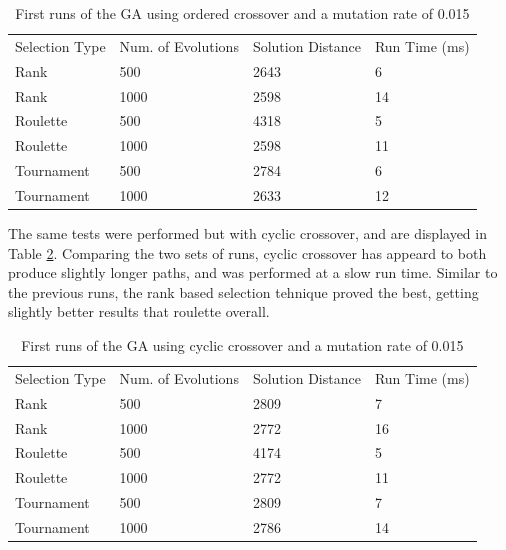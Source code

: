\documentclass[article]{IEEEtran}
\begin{document}
\begin{table}[H]
\centering
\caption{First runs of the GA using ordered crossover and a mutation rate of 0.015}
\label{tab:1}
\begin{tabular}{llll}
Selection Type & Num. of Evolutions & Solution Distance & Run Time (ms) \\
Rank           & 500                & 2643              & 6             \\
Rank           & 1000               & 2598              & 14            \\
Roulette       & 500                & 4318              & 5             \\
Roulette       & 1000               & 2598              & 11            \\
Tournament     & 500                & 2784              & 6             \\
Tournament     & 1000               & 2633              & 12           
\end{tabular}
\end{table}

The same tests were performed but with cyclic crossover, and are displayed in Table \ref{tab:2}. Comparing the two sets of runs, cyclic crossover has appeard to both produce slightly longer paths, and was performed at a slow run time. Similar to the previous runs, the rank based selection tehnique proved the best, getting slightly better results that roulette overall.

\begin{table}[H]
\centering
\caption{First runs of the GA using cyclic crossover and a mutation rate of 0.015}
\label{tab:2}
\begin{tabular}{llll}
Selection Type & Num. of Evolutions & Solution Distance & Run Time (ms) \\
Rank           & 500                & 2809              & 7            \\
Rank           & 1000               & 2772              & 16            \\
Roulette       & 500                & 4174              & 5             \\
Roulette       & 1000               & 2772              & 11            \\
Tournament     & 500                & 2809              & 7             \\
Tournament     & 1000               & 2786              & 14           
\end{tabular}
\end{table}
\end{document}
